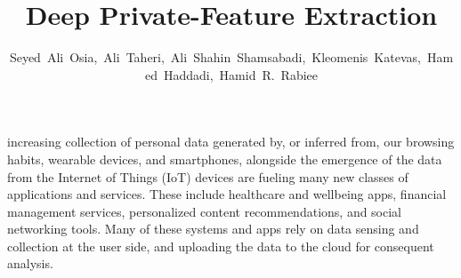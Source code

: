 \documentclass[10pt,journal,compsoc]{IEEEtran}
\begin{document}
\title{Deep Private-Feature Extraction}

\author{Seyed~Ali~Osia,~Ali~Taheri,~Ali~Shahin~Shamsabadi,~Kleomenis~Katevas,~Hamed~Haddadi,~Hamid~R.~Rabiee%
}















\maketitle


\IEEEdisplaynontitleabstractindextext



\IEEEpeerreviewmaketitle





 increasing collection of personal data generated by, or inferred from, our browsing habits, wearable devices, and smartphones, alongside the emergence of the data from the Internet of Things (IoT) devices are fueling many new classes of applications and services. These include healthcare and wellbeing apps, financial management services, personalized content recommendations, and social networking tools. Many of these systems and apps rely on data sensing and collection at the user side, and uploading the data to the cloud for consequent analysis. 
\end{document}
